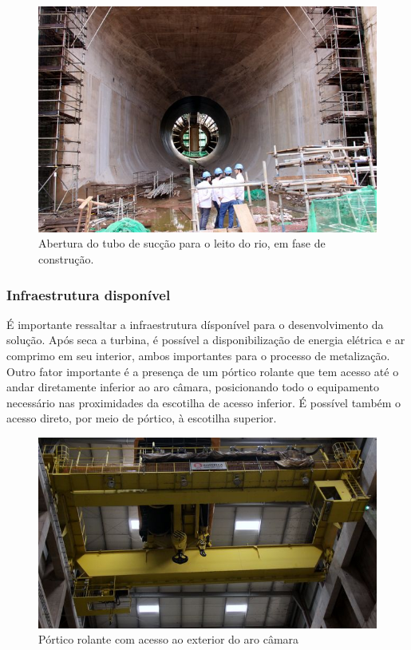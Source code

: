 \begin{figure}[H]	
	\includegraphics[width=\columnwidth]{figs/viagem/2015_04_30/Vao/img_5086}
	\caption{Abertura do tubo de sucção para o leito do rio, em fase de
	construção.}
	\label{fig::tubo_suc}
\end{figure}

\subsubsection{Infraestrutura disponível}
É importante ressaltar a infraestrutura dísponível para o desenvolvimento da solução. 
Após seca a turbina, é possível a disponibilização de energia elétrica e ar comprimo 
em seu interior, ambos importantes para o processo de metalização. Outro fator 
importante é a presença de um pórtico rolante que tem acesso até o andar diretamente 
inferior ao aro câmara, posicionando todo o equipamento necessário nas proximidades 
da escotilha de acesso inferior. É possível também o acesso direto, por meio de pórtico, 
à escotilha superior.

\begin{figure}[h!]	
	\includegraphics[width=\columnwidth]{figs/viagem/2015_04_28/UG/img_4989}
	\caption{Pórtico rolante com acesso ao exterior do aro câmara}
	\label{fig::portico}
\end{figure}


